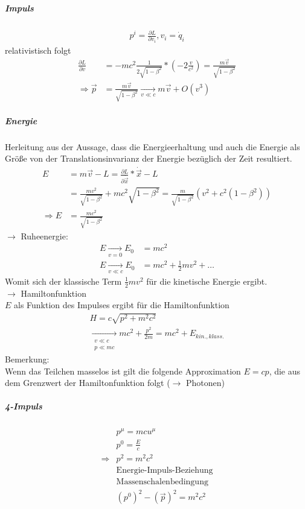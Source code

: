 \documentclass[a4paper]{article}
\begin{document}
\subparagraph{Impuls}
\begin{align}
p^i=\frac{\partial L}{\partial v_i}, v_i=\dot{q}_i
\end{align}
relativistisch folgt
\begin{align}
\frac{\partial L}{\partial v}&=-mc^2\frac{1}{2\sqrt{1-\beta^2}}
*(-2\frac{v}{c^2})=\frac{m\vec{v}}{\sqrt{1-\beta^2}}\\
\Rightarrow
\vec{p}&=\frac{m\vec{v}}{\sqrt{1-\beta^2}}\underset{v \ll c}{\longrightarrow}
m\vec{v} + O(v^3)
\end{align}
\subparagraph{Energie}
Herleitung aus der Aussage, dass die Energieerhaltung und auch die Energie als
Größe von der Translationsinvarianz der Energie bezüglich der Zeit resultiert.
\begin{align}
E&=m\vec{v}-L=\frac{\partial L}{\partial \dot{\vec{x}}}*\dot{\vec{x}}-L\\
&=\frac{mv^2}{\sqrt{1-\beta^2}}+mc^2\sqrt{1-\beta^2}=\frac{m}{\sqrt{1-\beta^2}}(v^2+c^2(1-\beta^2))\\
\Rightarrow E&=\frac{mc^2}{\sqrt{1-\beta^2}}
\end{align}
$\rightarrow$ Ruheenergie:
\begin{align}
E\underset{v=0}{\longrightarrow}E_0&=mc^2\\
E\underset{v \ll c}{\longrightarrow}E_0&=mc^2+\frac{1}{2}mv^2+\ldots
\end{align}
Womit sich der klassische Term $\frac{1}{2}mv^2$ für die kinetische Energie
ergibt.\\
$\rightarrow $ Hamiltonfunktion\\
$E$ als Funktion des Impulses ergibt für die Hamiltonfunktion
\begin{align}
H=c\sqrt{p^2+m^2c^2}\\
\underset{\substack{v\ll c\\p \ll mc}}{\longrightarrow}
mc^2+\frac{p^2}{2m}=mc^2+E_{kin.,klass.}
\end{align} 
Bemerkung:\\
Wenn das Teilchen masselos ist gilt die folgende Approximation $E=cp$, die aus
dem Grenzwert der Hamiltonfunktion folgt ($\rightarrow$ Photonen)
\subparagraph{4-Impuls}
\begin{align}
&p^\mu=mcu^\mu\\
&p^0=\frac{E}{c}\\
\Rightarrow &p^2=m^2c^2\\
\nonumber&\text{Energie-Impuls-Beziehung}\\
\nonumber&\text{Massenschalenbedingung}\\
&(p^0)^2-(\vec{p})^2=m^2c^2
\end{align}
\end{document}
